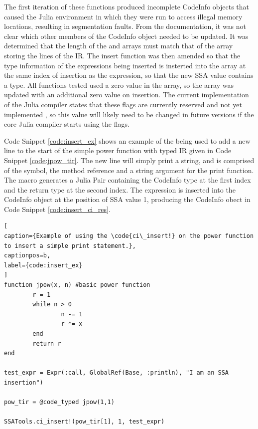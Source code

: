 The first iteration of these functions produced incomplete CodeInfo objects that caused the Julia environment in which they were run to access illegal memory locations, resulting in segmentation faults. From the documentation, it was not clear which other members of the CodeInfo object needed to be updated. It was determined that the length of the  and  arrays must match that of the array storing the lines of the IR. The insert function was then amended so that the type information of the expressions being inserted is insterted into the  array at the same index of insertion as the expression, so that the new SSA value contains a type. All functions tested used a zero value in the  array, so the array was updated with an additional zero value on insertion. The current implementation of the Julia compiler states that these flags are currently reserved and not yet implemented \cite{ci_doc}, so this value will likely need to be changed in future versions if the core Julia compiler starts using the flags.

Code Snippet \ref{code:insert_ex} shows an example of the  being used to add a new line to the start of the simple power function with typed IR given in Code Snippet \ref{code:jpow_tir}. The new line will simply print a string, and is comprised of the  symbol, the method reference  and a string argument for the print function. The  macro generates a Julia Pair containing the CodeInfo type at the first index and the return type at the second index. The expression is inserted into the CodeInfo object at the position of SSA value 1, producing the CodeInfo obect in Code Snippet \ref{code:insert_ci_res}.

\begin{lstlisting}[
caption={Example of using the \code{ci\_insert!} on the power function to insert a simple print statement.},
captionpos=b, 
label={code:insert_ex}
]
function jpow(x, n) #basic power function
        r = 1
        while n > 0
                n -= 1
                r *= x
        end
        return r
end

test_expr = Expr(:call, GlobalRef(Base, :println), "I am an SSA insertion")

pow_tir = @code_typed jpow(1,1)

SSATools.ci_insert!(pow_tir[1], 1, test_expr)

\end{lstlisting}

